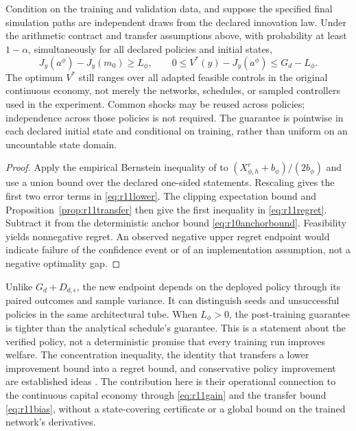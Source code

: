 \begin{theorem}\label{thm:r11certificate}
Condition on the training and validation data, and suppose the specified final simulation paths are independent draws from the declared innovation law. Under the arithmetic contract and transfer assumptions above, with probability at least $1-\alpha$, simultaneously for all declared policies and initial states,
\begin{equation}\label{eq:r11regret}
 J_y(a^\phi)-J_y(m_0)\geq L_\phi,
 \qquad 0\leq V^*(y)-J_y(a^\phi)\leq G_d-L_\phi.
\end{equation}
The optimum $V^*$ still ranges over all adapted feasible controls in the original continuous economy, not merely the networks, schedules, or sampled controllers used in the experiment. Common shocks may be reused across policies; independence across those policies is not required. The guarantee is pointwise in each declared initial state and conditional on training, rather than uniform on an uncountable state domain.
\end{theorem}

\begin{proof}
Apply the empirical Bernstein inequality of \citet[Theorem~4]{maurer2009} to $(X^c_{\phi,h}+b_\phi)/(2b_\phi)$ and use a union bound over the declared one-sided statements. Rescaling gives the first two error terms in \eqref{eq:r11lower}. The clipping expectation bound and Proposition~\ref{prop:r11transfer} then give the first inequality in \eqref{eq:r11regret}. Subtract it from the deterministic anchor bound \eqref{eq:r10anchorbound}. Feasibility yields nonnegative regret. An observed negative upper regret endpoint would indicate failure of the confidence event or of an implementation assumption, not a negative optimality gap.
\end{proof}

Unlike $G_d+D_{d,\epsilon}$, the new endpoint depends on the deployed policy through its paired outcomes and sample variance. It can distinguish seeds and unsuccessful policies in the same architectural tube. When $L_\phi>0$, the post-training guarantee is tighter than the analytical schedule's guarantee. This is a statement about the verified policy, not a deterministic promise that every training run improves welfare. The concentration inequality, the identity that transfers a lower improvement bound into a regret bound, and conservative policy improvement are established ideas \citep{kakade2002,pirotta2013,scherrer2015}. The contribution here is their operational connection to the continuous capital economy through \eqref{eq:r11gain} and the transfer bound \eqref{eq:r11bias}, without a state-covering certificate or a global bound on the trained network's derivatives.
